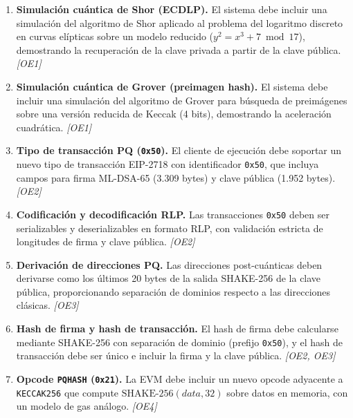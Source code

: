 \begin{enumerate}[label=\textbf{RF\arabic{enumi}:}, leftmargin=3em, labelsep=0.5em]
  \setcounter{enumi}{0}
  
  \item \textbf{Simulación cuántica de Shor (ECDLP).} El sistema debe incluir una simulación del algoritmo de Shor aplicado al problema del logaritmo discreto en curvas elípticas sobre un modelo reducido ($y^2 = x^3 + 7 \bmod 17$), demostrando la recuperación de la clave privada a partir de la clave pública. \hfill \emph{[OE1]}
  
  \item \textbf{Simulación cuántica de Grover (preimagen hash).} El sistema debe incluir una simulación del algoritmo de Grover para búsqueda de preimágenes sobre una versión reducida de Keccak (4 bits), demostrando la aceleración cuadrática. \hfill \emph{[OE1]}
  
  \item \textbf{Tipo de transacción PQ (\texttt{0x50}).} El cliente de ejecución debe soportar un nuevo tipo de transacción EIP-2718 con identificador \texttt{0x50}, que incluya campos para firma ML-DSA-65 (3.309 bytes) y clave pública (1.952 bytes). \hfill \emph{[OE2]}
  
  \item \textbf{Codificación y decodificación RLP.} Las transacciones \texttt{0x50} deben ser serializables y deserializables en formato RLP, con validación estricta de longitudes de firma y clave pública. \hfill \emph{[OE2]}
  
  \item \textbf{Derivación de direcciones PQ.} Las direcciones post-cuánticas deben derivarse como los últimos 20 bytes de la salida SHAKE-256 de la clave pública, proporcionando separación de dominios respecto a las direcciones clásicas. \hfill \emph{[OE3]}
  
  \item \textbf{Hash de firma y hash de transacción.} El hash de firma debe calcularse mediante SHAKE-256 con separación de dominio (prefijo \texttt{0x50}), y el hash de transacción debe ser único e incluir la firma y la clave pública. \hfill \emph{[OE2, OE3]}
  
  \item \textbf{Opcode \texttt{PQHASH} (\texttt{0x21}).} La EVM debe incluir un nuevo opcode adyacente a \texttt{KECCAK256} que compute $\text{SHAKE-256}(\mathit{data}, 32)$ sobre datos en memoria, con un modelo de gas análogo. \hfill \emph{[OE4]}
  

\end{enumerate}
